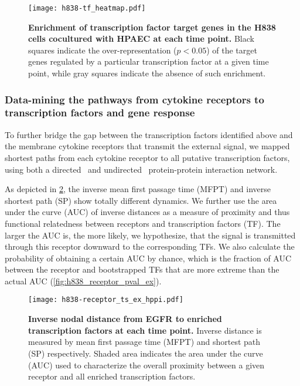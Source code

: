 \begin{figure}[!ht]
\begin{center}
\texttt{[image: h838-tf\_heatmap.pdf]}
\end{center}
\caption[Enrichment of transcription factors]{
{\bf Enrichment of transcription factor target genes in
the H838 cells cocultured with HPAEC at each time point.} 
Black squares indicate the over-representation ($p<0.05$) of the  
target genes regulated by a particular transcription factor
at a given time point, while gray squares indicate the
absence of such enrichment.
}
\label{fig:h838_tf}
\end{figure}

\subsubsection{Data-mining the pathways from cytokine receptors to transcription factors and gene response}

To further bridge the gap between the transcription factors identified above and the membrane cytokine receptors that 
transmit the external signal,
we mapped shortest paths from each cytokine receptor to all putative transcription factors, using both a directed~%
\citep{Vinayagam2011} and undirected~\citep{Schaefer2012} 
protein-protein interaction network.  

As depicted in \ref{fig:h838_receptor_ts_ex}, the inverse
mean first passage time (MFPT) and inverse shortest path 
(SP) show totally different dynamics. We further use the
area under the curve (AUC) of inverse distances as a 
measure of proximity and thus functional relatedness between
receptors and transcription factors (TF). 
The larger the AUC is,
the more likely, we hypothesize, that the signal is
transmitted through this receptor downward to the 
corresponding TFs. We also calculate the probability of
obtaining a certain AUC by chance, which is the fraction
of AUC between the receptor and bootstrapped TFs that are
more extreme than the actual AUC 
(\ref{fig:h838_receptor_pval_ex}).

\begin{figure}[!ht]
\begin{center}
\texttt{[image: h838-receptor\_ts\_ex\_hppi.pdf]}
\end{center}
\caption[Inverse distance over time]{
{\bf Inverse nodal distance from EGFR to enriched 
transcription factors at each time point.} 
Inverse distance is measured by mean first passage time
(MFPT) and shortest path (SP) respectively. Shaded area
indicates the area under the curve (AUC) used to 
characterize the overall proximity between a given
receptor and all enriched transcription factors.
}
\label{fig:h838_receptor_ts_ex}
\end{figure}

